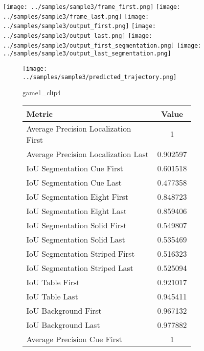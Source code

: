 \begin{figure}
    \texttt{[image: ../samples/sample3/frame\_first.png]}
    \texttt{[image: ../samples/sample3/frame\_last.png]}
    \newline
    \texttt{[image: ../samples/sample3/output\_first.png]}
    \texttt{[image: ../samples/sample3/output\_last.png]}
    \newline
    \texttt{[image: ../samples/sample3/output\_first\_segmentation.png]}
    \texttt{[image: ../samples/sample3/output\_last\_segmentation.png]}
    \newline
    \begin{subfigure}[b]{0.49\textwidth}
        \vspace{20pt}
        \texttt{[image: ../samples/sample3/predicted\_trajectory.png]}
        \caption*{game1\_clip4}
    \end{subfigure}
\begin{subfigure}[b]{0.49\textwidth}
    \begin{tabular}{|l|c|}
        \hline
        \textbf{Metric} & \textbf{Value} \\
        \hline
        Average Precision Localization First & 1 \\
        Average Precision Localization Last & 0.902597 \\
        \hline
        IoU Segmentation Cue First & 0.601518 \\
        IoU Segmentation Cue Last & 0.477358 \\
        IoU Segmentation Eight First & 0.848723 \\
        IoU Segmentation Eight Last & 0.859406 \\
        IoU Segmentation Solid First & 0.549807 \\
        IoU Segmentation Solid Last & 0.535469 \\
        IoU Segmentation Striped First & 0.516323 \\
        IoU Segmentation Striped Last & 0.525094 \\
        \hline
        IoU Table First & 0.921017 \\
        IoU Table Last & 0.945411 \\
        IoU Background First & 0.967132 \\
        IoU Background Last & 0.977882 \\
        \hline
        Average Precision Cue First & 1 \\

\end{tabular}
\end{subfigure}
\end{figure}
